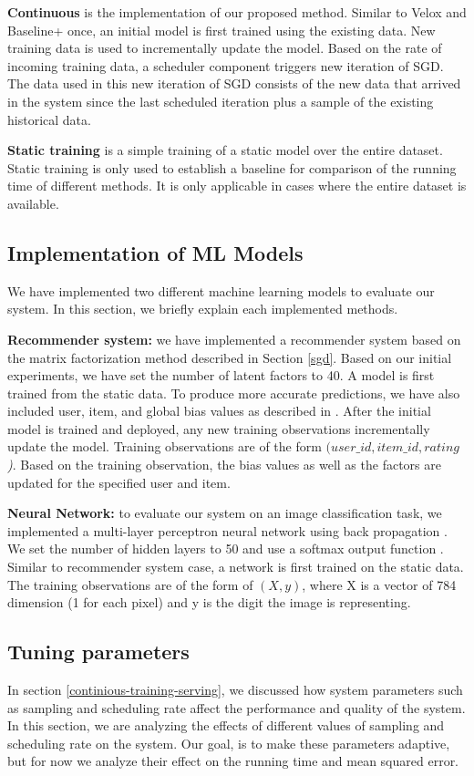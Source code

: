 \documentclass{vldb}
\begin{document}
\textbf{Continuous} is the implementation of our proposed method. 
Similar to Velox and Baseline+ once, an initial model is first trained using the existing data.
New training data is used to incrementally update the model.
Based on the rate of incoming training data, a scheduler component triggers new iteration of SGD.
The data used in this new iteration of SGD consists of the new data that arrived in the system since the last scheduled iteration plus a sample of the existing historical data.

\textbf{Static training} is a simple training of a static model over the entire dataset. 
Static training is only used to establish a baseline for comparison of the running time of different methods.
It is only applicable in cases where the entire dataset is available.

\subsection{Implementation of ML Models}
We have implemented two different machine learning models to evaluate our system.
In this section, we briefly explain each implemented methods.

\textbf{Recommender system:} we have implemented a recommender system based on the matrix factorization method described in Section \ref{sgd}.
Based on our initial experiments, we have set the number of latent factors to 40.
A model is first trained from the static data.
To produce more accurate predictions, we have also included user, item, and global bias values as described in \cite{koren2009matrix}.
After the initial model is trained and deployed, any new training observations incrementally update the model.
Training observations are of the form \textit{\((user\_id, item\_id, rating\))}.
Based on the training observation, the bias values as well as the factors are updated for the specified user and item.

\textbf{Neural Network:} to evaluate our system on an image classification task, we implemented a multi-layer perceptron neural network using back propagation \cite{collobert2004links}.
We set the number of hidden layers to 50 and use a softmax output function \cite{bishop2006pattern}.
Similar to recommender system case, a network is first trained on the static data.
The training observations are of the form of \textit{\((X,y)\)}, where X is a vector of 784 dimension (1 for each pixel) and y is the digit the image is representing.

\subsection{Tuning parameters} \label{tuning}
In section \ref{continious-training-serving}, we discussed how system parameters such as sampling and scheduling rate affect the performance and quality of the system.
In this section, we are analyzing the effects of different values of sampling and scheduling rate on the system.
Our goal, is to make these parameters adaptive, but for now we analyze their effect on the running time and mean squared error. 
\end{document}
